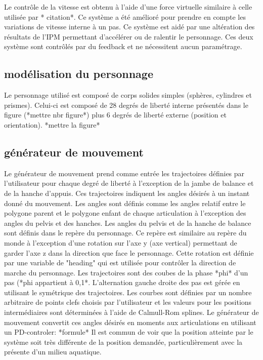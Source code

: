 \documentclass{llncs}
\begin{document}
Le contrôle de la vitesse est obtenu à l'aide d'une force virtuelle similaire à celle utilisée par * citation*. Ce système a été amélioré pour prendre en compte les variations de vitesse interne à un pas. Ce système est aidé par une altération des résultats de l'IPM permettant d'accélérer ou de ralentir le personnage. Ces deux système sont contrôlés par du feedback et ne nécessitent aucun paramétrage.
%
\subsection{modélisation du personnage}
%
Le personnage utilisé est composé de corps solides simples (sphères, cylindres et prismes). Celui-ci est composé de 28 degrés de liberté interne présentés dans le figure (*mettre nbr figure*) plus 6 degrés de liberté externe (position et orientation).
*mettre la figure*
%
\subsection{générateur de mouvement}

Le générateur de mouvement prend comme entrée les trajectoires définies par l'utilisateur pour chaque degré de liberté à l'exception de la jambe de balance et de la hanche d'appuis. Ces trajectoires indiquent les angles désirés à un instant donné du mouvement. Les angles sont définis comme les angles relatif entre le polygone parent et le polygone enfant de chaque articulation à l'exception des angles du pelvis et des hanches. Les angles du pelvis et de la hanche de balance sont définis dans le repère du personnage. Ce repère est similaire au repère du monde à l'exception d'une rotation sur l'axe y (axe vertical) permettant de garder l'axe z dans la direction que face le personnage. Cette rotation est définie par une variable de "heading" qui est utilisée pour contrôler la direction de marche du personnage. Les trajectoires sont des coubes de la phase *phi* d'un pas (*phi appartient à 0,1*. L'alternation gauche droite des pas est gérée en utilisant le symétrique des trajectoires. Les courbes sont définies par un nombre arbitraire de points clefs choisis par l'utilisateur et les valeurs pour les positions intermédiaires sont déterminées à l'aide de Calmull-Rom splines.
Le générateur de mouvement convertit ces angles désirés en moments aux articulations en utilisant un PD-controler:
*formule*
Il est commun de voir que la position atteinte par le système soit très différente de la position demandée, particulièrement avec la présente d'un milieu aquatique. 
\end{document}
